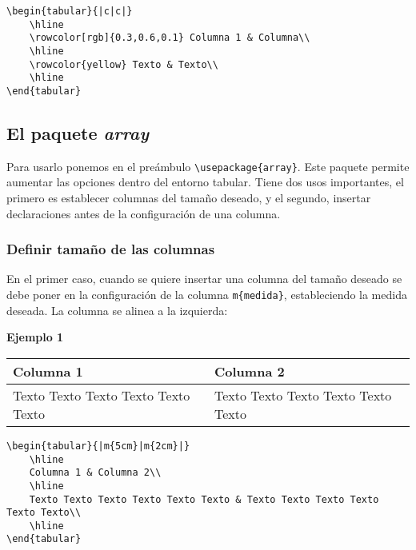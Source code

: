 \begin{myquote}
	\begin{lstlisting}
\begin{tabular}{|c|c|}
	\hline
	\rowcolor[rgb]{0.3,0.6,0.1} Columna 1 & Columna\\ 	
	\hline
	\rowcolor{yellow} Texto & Texto\\
	\hline
\end{tabular}		
	\end{lstlisting}			
\end{myquote}


\subsection{El paquete \textsl{array}}

Para usarlo ponemos en el preámbulo \verb|\usepackage{array}|. Este paquete permite aumentar las opciones dentro del entorno tabular. Tiene dos usos importantes, el primero es establecer columnas del tamaño deseado, y el segundo, insertar declaraciones antes de la configuración de una columna.

\subsubsection{Definir tamaño de las columnas}

En el primer caso, cuando se quiere insertar una columna del tamaño deseado se debe poner en la configuración de la columna \verb|m{medida}|, estableciendo la medida deseada. La columna se alinea a la izquierda:

\textbf{Ejemplo 1}

\begin{center}
	\begin{tabular}{|m{5cm}|m{2cm}|}
		\hline
		Columna 1 & Columna 2\\
		\hline		
		Texto Texto Texto Texto Texto Texto & Texto Texto Texto Texto Texto Texto\\
		\hline	
	\end{tabular}
\end{center}

\begin{myquote}
	\begin{lstlisting}
\begin{tabular}{|m{5cm}|m{2cm}|}
	\hline
	Columna 1 & Columna 2\\
	\hline		
	Texto Texto Texto Texto Texto Texto & Texto Texto Texto Texto Texto Texto\\
	\hline	
\end{tabular}		
		\end{lstlisting}
	\end{myquote}
	
